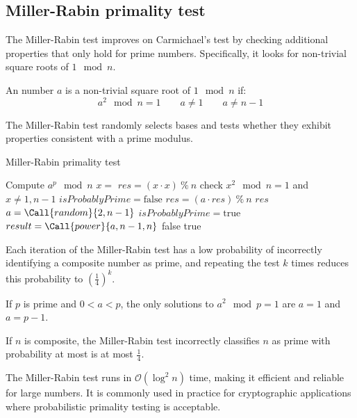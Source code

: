 \subsection{Miller-Rabin primality test}
The Miller-Rabin test improves on Carmichael's test by checking additional properties that only hold for prime numbers. 
Specifically, it looks for non-trivial square roots of $1\mod n$. 
\begin{definition}
    An number $a$ is a non-trivial square root of $1 \mod n$ if: 
    \[a^2 \mod n = 1 \qquad a \neq 1 \qquad a \neq n - 1\]
\end{definition}
The Miller-Rabin test randomly selects bases and tests whether they exhibit properties consistent with a prime modulus.
\begin{algorithm}[H]
    \caption{Miller-Rabin primality test}
    \begin{algorithmic}[1]
             \Comment Compute $a^p \mod n$
                \State {}
            \EndIf 
            \State $x=$ 
            \State $res= (x \cdot x)\:\%\:n$
             \Comment check $x^2 \mod n = 1$ and $x \neq 1, n-1$
                \State $isProbablyPrime=\text{false}$
            \EndIf
                \State $res=(a\cdot res)\:\%\:n$
            \EndIf
            \State \Return $res$
        \EndFunction
        \Statex 
            \State $a = \Call{random}{2, n-1}$
            \State $isProbablyPrime = \text{true}$
            \State $result = \Call{power}{a, n-1, n}$
                \State \Return false
            \Else
                \State \Return true
            \EndIf
        \EndFunction
    \end{algorithmic}
\end{algorithm}
Each iteration of the Miller-Rabin test has a low probability of incorrectly identifying a composite number as prime, and repeating the test $k$ times reduces this probability to $\left(\frac{1}{4}\right)^k$. 
\begin{theorem}
    If $p$ is prime and $0 < a < p$, the only solutions to $a^2 \mod p = 1$ are $a = 1$ and $a = p - 1$.
\end{theorem}
\begin{theorem}
    If $n$ is composite, the Miller-Rabin test incorrectly classifies $n$ as prime with probability at most is at most $\frac{1}{4}$.
\end{theorem}
The Miller-Rabin test runs in $\mathcal{O}(\log^2n)$ time, making it efficient and reliable for large numbers. 
It is commonly used in practice for cryptographic applications where probabilistic primality testing is acceptable.